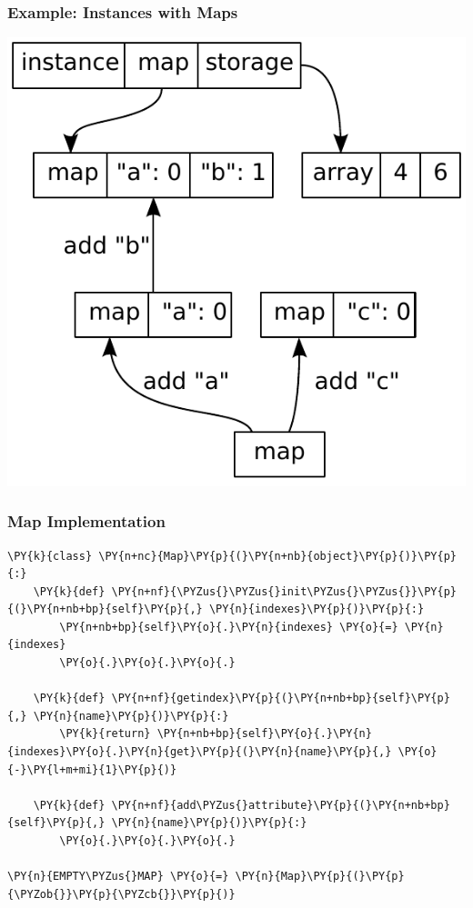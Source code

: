 \documentclass[utf8x]{beamer}
\begin{document}
\begin{frame}
  \frametitle{Example: Instances with Maps}
  \includegraphics[scale=0.7]{figures/map03.pdf}
\end{frame}

\begin{frame}[containsverbatim]
\frametitle{Map Implementation}

\begin{Verbatim}[commandchars=\\\{\}]
\PY{k}{class} \PY{n+nc}{Map}\PY{p}{(}\PY{n+nb}{object}\PY{p}{)}\PY{p}{:}
    \PY{k}{def} \PY{n+nf}{\PYZus{}\PYZus{}init\PYZus{}\PYZus{}}\PY{p}{(}\PY{n+nb+bp}{self}\PY{p}{,} \PY{n}{indexes}\PY{p}{)}\PY{p}{:}
        \PY{n+nb+bp}{self}\PY{o}{.}\PY{n}{indexes} \PY{o}{=} \PY{n}{indexes}
        \PY{o}{.}\PY{o}{.}\PY{o}{.}

    \PY{k}{def} \PY{n+nf}{getindex}\PY{p}{(}\PY{n+nb+bp}{self}\PY{p}{,} \PY{n}{name}\PY{p}{)}\PY{p}{:}
        \PY{k}{return} \PY{n+nb+bp}{self}\PY{o}{.}\PY{n}{indexes}\PY{o}{.}\PY{n}{get}\PY{p}{(}\PY{n}{name}\PY{p}{,} \PY{o}{-}\PY{l+m+mi}{1}\PY{p}{)}

    \PY{k}{def} \PY{n+nf}{add\PYZus{}attribute}\PY{p}{(}\PY{n+nb+bp}{self}\PY{p}{,} \PY{n}{name}\PY{p}{)}\PY{p}{:}
        \PY{o}{.}\PY{o}{.}\PY{o}{.}

\PY{n}{EMPTY\PYZus{}MAP} \PY{o}{=} \PY{n}{Map}\PY{p}{(}\PY{p}{\PYZob{}}\PY{p}{\PYZcb{}}\PY{p}{)}
\end{Verbatim}
\end{frame}
\end{document}
